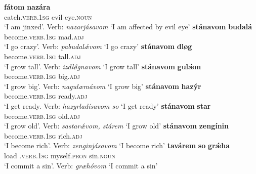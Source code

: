 \documentclass[output=paper,colorlinks,citecolor=brown]{langscibook}
\begin{document}
 \begin{xlist}
\ex
\gll \textbf{{fátom}} \textbf{{nazára}} \\
{catch}.\textsc{verb.1sg}  {evil eye}.\textsc{noun} \\
\glt `I am jinxed'. Verb: \textit{nazarjásavom} `I am affected by evil eye'
\ex 
\gll \textbf{{stánavom}} \textbf{{budalá}} \\
{become}.\textsc{verb.1sg}  mad.\textsc{adj} \\
\glt `I go crazy'. Verb: \textit{pabudalǽvom} `I go crazy'
\ex 
\gll \textbf{{stánavom}} \textbf{{dløg}} \\
{become}.\textsc{verb.1sg} tall.\textsc{adj} \\
\glt `I grow tall'. Verb: \textit{izdlǿgnavom} `I grow tall'
\ex 
\gll \textbf{{stánavom}} \textbf{{gulǽm}} \\
{become}.\textsc{verb.1sg}  big.\textsc{adj} \\
\glt `I grow big'. Verb: \textit{nagulæmávom} `I grow big'
\ex 
\gll \textbf{{stánavom}} \textbf{{hazýr}} \\
{become}.\textsc{verb.1sg} ready.\textsc{adj}\\
\glt `I get ready. Verb: \textit{hazyrladísavom so} `I get ready'
\ex 
\gll \textbf{{stánavom}} \textbf{{star}}\\
{become}.\textsc{verb.1sg}  old.\textsc{adj} \\
\glt `I grow old'. Verb: \textit{sastarǽvom, stárem} `I grow old'
\ex 
\gll \textbf{{stánavom}} \textbf{{zengínin}} \\
{become}.\textsc{verb.1sg}  rich.\textsc{adj} \\
\glt `I become rich'. Verb: \textit{zenginjásavom} `I become rich'
\ex 
\gll \textbf{{tavárem}} \textbf{{so}} \textbf{{grǽha}} \\ 
{load }.\textsc{verb.1sg}  myself.\textsc{pron}  sin.\textsc{noun} \\
\glt `I commit a sin'. Verb: \textit{græhóvom} `I commit a sin'
\end{xlist}
\z
\end{document}

